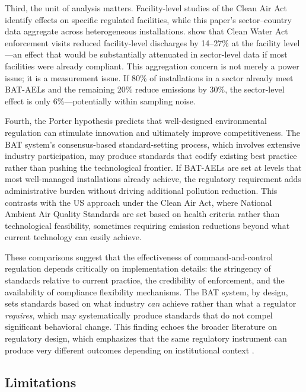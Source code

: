 \documentclass[12pt]{article}
\begin{document}
Third, the unit of analysis matters. Facility-level studies of the Clean Air Act identify effects on specific regulated facilities, while this paper's sector--country data aggregate across heterogeneous installations. \citet{colmer2024} show that Clean Water Act enforcement visits reduced facility-level discharges by 14--27\% at the facility level---an effect that would be substantially attenuated in sector-level data if most facilities were already compliant. This aggregation concern is not merely a power issue; it is a measurement issue. If 80\% of installations in a sector already meet BAT-AELs and the remaining 20\% reduce emissions by 30\%, the sector-level effect is only 6\%---potentially within sampling noise.

Fourth, the Porter hypothesis \citep{porter1995} predicts that well-designed environmental regulation can stimulate innovation and ultimately improve competitiveness. The BAT system's consensus-based standard-setting process, which involves extensive industry participation, may produce standards that codify existing best practice rather than pushing the technological frontier. If BAT-AELs are set at levels that most well-managed installations already achieve, the regulatory requirement adds administrative burden without driving additional pollution reduction. This contrasts with the US approach under the Clean Air Act, where National Ambient Air Quality Standards are set based on health criteria rather than technological feasibility, sometimes requiring emission reductions beyond what current technology can easily achieve.

These comparisons suggest that the effectiveness of command-and-control regulation depends critically on implementation details: the stringency of standards relative to current practice, the credibility of enforcement, and the availability of compliance flexibility mechanisms. The BAT system, by design, sets standards based on what industry \emph{can} achieve rather than what a regulator \emph{requires}, which may systematically produce standards that do not compel significant behavioral change. This finding echoes the broader literature on regulatory design, which emphasizes that the same regulatory instrument can produce very different outcomes depending on institutional context \citep{duflo2013, ryan2012}.

\subsection{Limitations}
\end{document}
